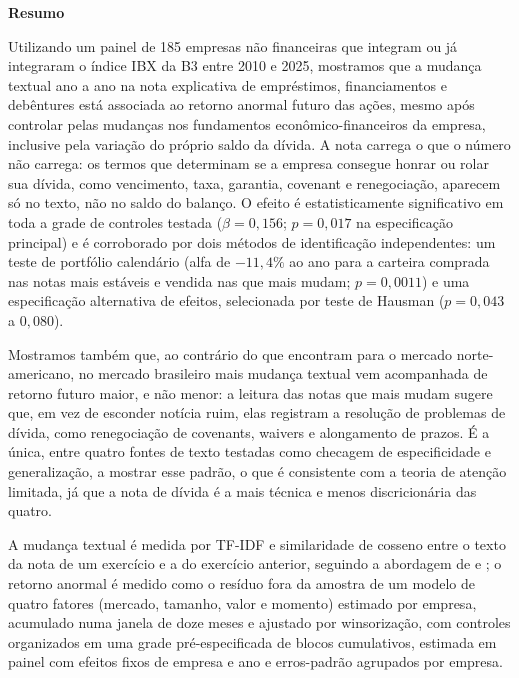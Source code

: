 \documentclass[a4paper,12pt]{report}
\renewenvironment{abstract}{
    \begin{center}
        \textbf{\abstractname}
    \end{center}
}{}
\begin{document}
\renewcommand{\abstractname}{Resumo}
\begin{abstract}
    Utilizando um painel de 185 empresas não financeiras que integram ou já integraram o índice IBX da B3 entre 2010 e 2025, mostramos que a mudança textual ano a ano na nota explicativa de empréstimos, financiamentos e debêntures está associada ao retorno anormal futuro das ações, mesmo após controlar pelas mudanças nos fundamentos econômico-financeiros da empresa, inclusive pela variação do próprio saldo da dívida. A nota carrega o que o número não carrega: os termos que determinam se a empresa consegue honrar ou rolar sua dívida, como vencimento, taxa, garantia, covenant e renegociação, aparecem só no texto, não no saldo do balanço. O efeito é estatisticamente significativo em toda a grade de controles testada ($\beta=0{,}156$; $p=0{,}017$ na especificação principal) e é corroborado por dois métodos de identificação independentes: um teste de portfólio calendário (alfa de $-11{,}4\%$ ao ano para a carteira comprada nas notas mais estáveis e vendida nas que mais mudam; $p=0{,}0011$) e uma especificação alternativa de efeitos, selecionada por teste de Hausman ($p=0{,}043$ a $0{,}080$).

    \noindent Mostramos também que, ao contrário do que  encontram para o mercado norte-americano, no mercado brasileiro mais mudança textual vem acompanhada de retorno futuro maior, e não menor: a leitura das notas que mais mudam sugere que, em vez de esconder notícia ruim, elas registram a resolução de problemas de dívida, como renegociação de covenants, waivers e alongamento de prazos. É a única, entre quatro fontes de texto testadas como checagem de especificidade e generalização, a mostrar esse padrão, o que é consistente com a teoria de atenção limitada, já que a nota de dívida é a mais técnica e menos discricionária das quatro.

    \noindent A mudança textual é medida por TF-IDF e similaridade de cosseno entre o texto da nota de um exercício e a do exercício anterior, seguindo a abordagem de  e ; o retorno anormal é medido como o resíduo fora da amostra de um modelo de quatro fatores (mercado, tamanho, valor e momento) estimado por empresa, acumulado numa janela de doze meses e ajustado por winsorização, com controles organizados em uma grade pré-especificada de blocos cumulativos, estimada em painel com efeitos fixos de empresa e ano e erros-padrão agrupados por empresa.
\end{abstract}
\end{document}
